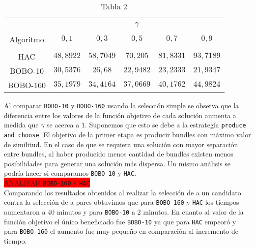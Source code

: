 \begin{table}[h]
  \centering
  \resizebox{\textwidth}{!} {
    \begin{tabular}{c|ccccc}
    ~          & \multicolumn{5}{c}{$\gamma$} \\
    Algoritmo  & $0,1$ & $0,3$ & $0,5$ & $0,7$ & $0,9$ \\
    \hline \\
    HAC        & $48,8922$ & $58,7049$ & $70,205$ & $81,8331$ & $93,7189$ \\
    BOBO-10    & $30,5376$ & $26,68$ & $22,9482$ & $23,2333$ & $21,9347$ \\
    BOBO-160   & $35,1979$ & $34,4164$ & $37,0669$ & $40,1762$ & $44,9824$\\
    \end{tabular}
  }
    \caption {Tabla 2}
\end{table}
Al comparar \texttt{BOBO-10} y \texttt{BOBO-160} usando la selección simple se observa que la 
diferencia entre los valores de la función objetivo de cada solución aumenta a medida que $\gamma$ 
se acerca a $1$. Suponemos que esto se debe a la estrategía \texttt{produce and choose}. El objetivo 
de la primer etapa es producir bundles con máximo valor de similitud. En el caso de que se requiera 
una solución con mayor separación entre bundles, al haber producido menos cantidad de bundles 
existen menos posibilidades para generar una solución más dispersa. Un mismo análisis se podría 
hacer si comparamos \texttt{BOBO-10} y \texttt{HAC}.\\
\colorbox{red}{ANALIZAR \texttt{BOBO-160} y \texttt{HAC}}\\
Comparando los resultados obtenidos al realizar la selección de a un candidato contra la selección 
de a pares obtuvimos que para \texttt{BOBO-160} y \texttt{HAC} los tiempos aumentaron a $40$ 
minutos y para \texttt{BOBO-10} a $2$ minutos. En cuanto al valor de la función objetivo el único 
beneficiado fue \texttt{BOBO-10} ya que para \texttt{HAC} empeoró y para \texttt{BOBO-160} el 
aumento fue muy pequeño en comparación al incremento de tiempo.
